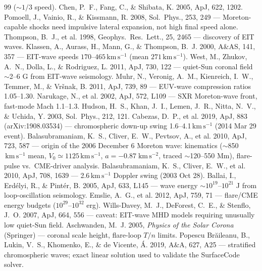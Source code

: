 \documentclass[11pt,a4paper]{article}
\newcommand{\kms}{\,\mathrm{km\,s^{-1}}}
\begin{document}
\begin{thebibliography}{99}
($\sim$$1/3$ speed).
 Chen, P.~F., Fang, C., \& Shibata, K. 2005, ApJ, 622, 1202.
 Pomoell, J., Vainio, R., \& Kissmann, R. 2008, Sol.~Phys., 253, 249
--- Moreton-capable shocks need impulsive lateral expansion, not high final speed alone.
 Thompson, B.~J., et al. 1998, Geophys.~Res.~Lett., 25, 2465 ---
discovery of EIT waves.
 Klassen, A., Aurass, H., Mann, G., \& Thompson, B.~J. 2000, A\&AS,
141, 357 --- EIT-wave speeds $170$--$465\kms$ (mean $271\kms$).
 West, M., Zhukov, A.~N., Dolla, L., \& Rodriguez, L. 2011, ApJ, 730,
122 --- quiet-Sun coronal field $\sim$2--6 G from EIT-wave seismology.
 Muhr, N., Veronig, A.~M., Kienreich, I.~W., Temmer, M., \& Vr\v{s}nak,
B. 2011, ApJ, 739, 89 --- EUV-wave compression ratios 1.05--1.30.
 Narukage, N., et al. 2002, ApJ, 572, L109 --- SXR Moreton-wave
front, fast-mode Mach 1.1--1.3.
 Hudson, H.~S., Khan, J.~I., Lemen, J.~R., Nitta, N.~V., \& Uchida,
Y. 2003, Sol.~Phys., 212, 121.
 Cabezas, D.~P., et al. 2019, ApJ, 883 (arXiv:1908.03534) ---
chromospheric down-up swing 1.6--4.1$\kms$ (2014 Mar 29 event).
 Balasubramaniam, K.~S., Cliver, E.~W., Pevtsov, A., et al. 2010,
ApJ, 723, 587 --- origin of the 2006 December 6 Moreton wave: kinematics
($\sim$850$\kms$ mean, $V_0\simeq1125\kms$, $a=-0.87\;\mathrm{km\,s^{-2}}$, traced
$\sim$120--550 Mm), flare-pulse vs.\ CME-driver analysis.
 Balasubramaniam, K.~S., Cliver, E.~W., et al. 2010, ApJ,
708, 1639 --- 2.6$\kms$ Doppler swing (2003 Oct 28).
 Ballai, I., Erd\'elyi, R., \& Pint\'er, B. 2005, ApJ, 633, L145 ---
wave energy $\sim$$10^{19}$--$10^{21}$ J from loop-oscillation seismology.
 Emslie, A.~G., et al. 2012, ApJ, 759, 71 --- flare/CME energy
budgets ($10^{29}$--$10^{32}$ erg).
 Wills-Davey, M.~J., DeForest, C.~E., \& Stenflo, J.~O. 2007,
ApJ, 664, 556 --- caveat: EIT-wave MHD models requiring unusually low quiet-Sun field.
 Aschwanden, M.~J. 2005, \emph{Physics of the Solar Corona}
(Springer) --- coronal scale height, flare-loop $T/n$ limits.
 Popescu Br\u{a}ileanu, B., Lukin, V.~S., Khomenko, E., \&
de Vicente, \'A. 2019, A\&A, 627, A25 --- stratified chromospheric waves; exact linear
solution used to validate the SurfaceCode solver.
\end{thebibliography}
\end{document}

